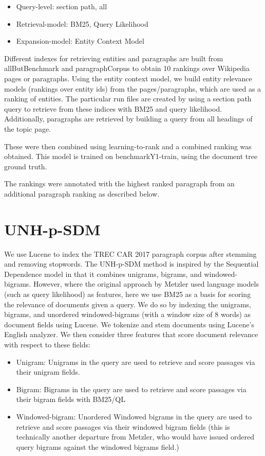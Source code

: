 \documentclass{article}
\begin{document}
\begin{itemize}
   \item Query-level: section path, all
    \item Retrieval-model: BM25, Query Likelihood
    \item Expansion-model: Entity Context Model
\end{itemize}

Different indexes for retrieving entities and paragraphs are built from allButBenchmark and paragraphCorpus to obtain 10 rankings over Wikipedia pages or paragraphs. Using the entity context model, we build entity relevance models (rankings over entity ids) from the pages/paragraphs, which are used as a ranking of entities. The particular run files are created by using a section path query to retrieve from these indices with BM25 and query likelihood. Additionally, paragraphs are retrieved by building a query from all headings of the topic page.

These were then combined using  learning-to-rank and a combined ranking was obtained. 
This model is trained on benchmarkY1-train, using the document tree ground truth.

The rankings were annotated with the highest ranked paragraph from an additional paragraph ranking as described below.


\section{UNH-p-SDM}\label{sec:sdm}

We use Lucene to index the TREC CAR 2017 paragraph corpus after stemming and removing stopwords.
The UNH-p-SDM method is inspired by the Sequential Dependence model \cite{metzler2005markov} in that it combines unigrams, bigrams, and windowed-bigrams. However, where the original approach by Metzler used language models (such as query likelihood) as features, here we use BM25 as a basis for scoring the relevance of documents given a query. We do so by indexing the unigrams, bigrams, and unordered windowed-bigrams (with a window size of 8 words) as document fields using Lucene. We tokenize and stem documents using Lucene's English analyzer. We then consider three features that score document relevance with respect to these fields:
 
 \begin{itemize}
     \item Unigram: Unigrams in the query are used to retrieve and score passages via their unigram fields.
     \item Bigram: Bigrams in the query are used to retrieve and score passages via their bigram fields with BM25/QL
     \item Windowed-bigram: Unordered Windowed bigrams in the query are used to retrieve and score passages via their windowed bigram fields (this is technically another departure from Metzler, who would have issued ordered query bigrams against the windowed bigrams field.)
 \end{itemize}
 
\end{document}
